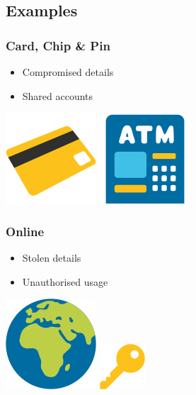 \documentclass{beamer}
\begin{document}
    \subsection{Examples}
      \begin{frame}
        \frametitle{Card, Chip \& Pin}
        \begin{itemize}
          \item Compromised details
          \item Shared accounts
        \end{itemize}
        \vfill
        \includegraphics[scale=0.25]{card}\cite{WikiCommonsEmoji}
        \hfill
        \includegraphics[scale=0.25]{atm}\cite{WikiCommonsEmoji}
      \end{frame}
      \begin{frame}
        \frametitle{Online}
        \begin{itemize}
          \item Stolen details
          \item Unauthorised usage
        \end{itemize}
        \vfill
        \includegraphics[scale=0.25]{web}\cite{WikiCommonsEmoji}
        \hfill
        \includegraphics[scale=0.5]{password}\cite{WikiCommonsEmoji}
      \end{frame}
\end{document}
